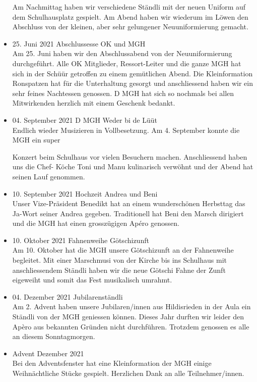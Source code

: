\begin{history}
\begin{itemize}
              Am Nachmittag haben wir verschiedene Ständli mit der neuen Uniform auf dem
              Schulhausplatz gespielt.
              Am Abend haben wir wiederum im Löwen den Abschluss von der kleinen, aber sehr
              gelungener Neuuniformierung gemacht.

        \item 25. Juni 2021 Abschlussesse OK und MGH\\
              Am 25. Juni haben wir den Abschlussabend von der Neuuniformierung durchgeführt.
              Alle OK Mitglieder, Ressort-Leiter und die ganze MGH hat sich in der Schüür getroffen zu
              einem gemütlichen Abend. Die Kleinformation Ronspatzen hat für die Unterhaltung gesorgt
              und anschliessend haben wir ein sehr feines Nachtessen genossen. D MGH hat sich so
              nochmals bei allen Mitwirkenden herzlich mit einem Geschenk bedankt.

        \item 04. September 2021 D MGH Weder bi de Lüüt\\
              Endlich wieder Musizieren in Vollbesetzung. Am 4. September konnte die MGH ein super

              Konzert beim Schulhaus vor vielen Besuchern machen. Anschliessend haben uns die Chef-
              Köche Toni und Manu kulinarisch verwöhnt und der Abend hat seinen Lauf genommen.

        \item 10. September 2021 Hochzeit Andrea und Beni\\
              Unser Vize-Präsident Benedikt hat an einem wunderschönen Herbsttag das Ja-Wort seiner
              Andrea gegeben.
              Traditionell hat Beni den Marsch dirigiert und die MGH hat einen grosszügigen Apéro
              genossen.

        \item 10. Oktober 2021 Fahnenweihe Götschizunft\\
              Am 10. Oktober hat die MGH unsere Götschizunft an der Fahnenweihe begleitet.
              Mit einer Marschmusi von der Kirche bis ins Schulhaus mit anschliessendem Ständli haben
              wir die neue Götschi Fahne der Zunft eigeweiht und somit das Fest musikalisch umrahmt.

        \item 04. Dezember 2021 Jubilarenständli\\
              Am 2. Advent haben unsere Jubilaren/innen aus Hildisrieden in der Aula ein Ständli von der
              MGH geniessen können. Dieses Jahr durften wir leider den Apèro aus bekannten Gründen
              nicht durchführen. Trotzdem genossen es alle an diesem Sonntagmorgen.

        \item Advent Dezember 2021\\
              Bei den Adventsfenster hat eine Kleinformation der MGH einige Weihnächtliche Stücke
              gespielt. Herzlichen Dank an alle Teilnehmer/innen.


    \end{itemize}

\end{history}
